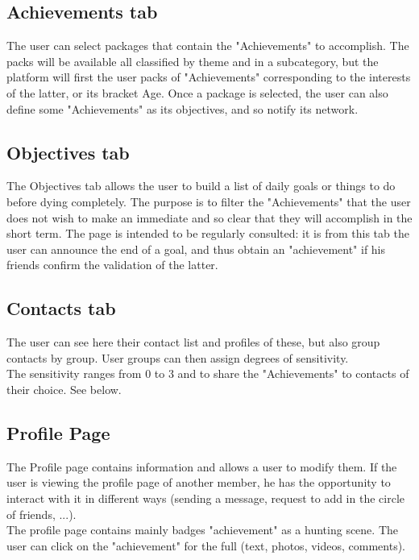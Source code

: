 \documentclass {life-en}
\begin{document}
\subsection{Achievements tab}

The user can select packages that contain the "Achievements" to accomplish. The packs will be available all classified by theme and in a subcategory, but the platform will first the user packs of "Achievements" corresponding to the interests of the latter, or its bracket Age. Once a package is selected, the user can also define some "Achievements" as its objectives, and so notify its network.

\subsection{Objectives tab}

The Objectives tab allows the user to build a list of daily goals or things to do before dying completely. The purpose is to filter the "Achievements" that the user does not wish to make an immediate and so clear that they will accomplish in the short term. The page is intended to be regularly consulted: it is from this tab the user can announce the end of a goal, and thus obtain an "achievement" if his friends confirm the validation of the latter.

\subsection{Contacts tab}

The user can see here their contact list and profiles of these, but also group contacts by group. User groups can then assign degrees of sensitivity.\\
The sensitivity ranges from 0 to 3 and to share the "Achievements" to contacts of their choice. See below.

\subsection{Profile Page}

The Profile page contains information and allows a user to modify them. If the user is viewing the profile page of another member, he has the opportunity to interact with it in different ways (sending a message, request to add in the circle of friends, ...).\\
The profile page contains mainly badges "achievement" as a hunting scene. The user can click on the "achievement" for the full (text, photos, videos, comments).
\end{document}
